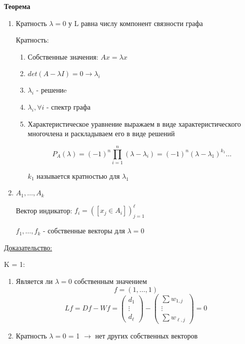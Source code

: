\documentclass[a4paper, 12pt]{article}
\begin{document}
\begin{enumerate}
    \textbf{Теорема}

    \begin{enumerate}
        \item Кратность $\lambda = 0$ у L равна
        числу компонент связности графа
        
        Кратность:
        
        \begin{enumerate}
            \item Собственные значения: $Ax = \lambda x$
            \item $det(A - \lambda I) = 0 \rightarrow \lambda_i$
            \item $\lambda_i$ - решениe
            \item ${\lambda_i}, \forall i$ - спектр графа
            \item Характеристическое уравнение выражаем в виде
            характеристического многочлена и раскладываем его
            в виде решений

            \[P_A(\lambda) = 
            (-1)^{n}\prod_{i = 1}^{n}(\lambda - \lambda_i) = 
            (-1)^n(\lambda - \lambda_1)^{k_1}\ldots\]

            $k_1$ называется кратностью для $\lambda_1$
        \end{enumerate}
        \item $A_1, \ldots, A_k$
        
        Вектор индикатор: $f_i = ([x_j \in A_i])_{j = 1}^{\ell}$

        $f_1, \ldots, f_k$ - собственные векторы для $\lambda = 0$
    \end{enumerate}

    \underline{Доказательство:}

    K = 1:

    \begin{enumerate}
        \item Является ли $\lambda = 0$ собственным значением
        \[f = (1, \ldots, 1)\]
        \[Lf = Df - Wf =
        \begin{pmatrix}
            d_1 \\
            \vdots \\
            d_{\ell}
        \end{pmatrix} - 
        \begin{pmatrix}
            \sum w_{1, j} \\
            \vdots \\
            \sum w_{\ell, j}
        \end{pmatrix} = 0\]
        \item Кратность $\lambda = 0$ = 1 $\rightarrow$
        нет других собственных векторов
        

\end{enumerate}
\end{enumerate}
\end{document}
